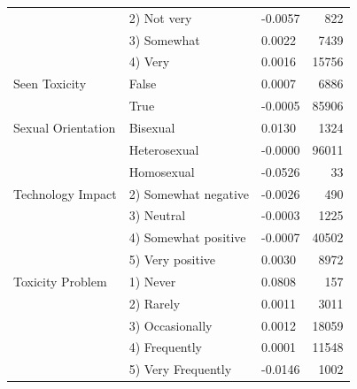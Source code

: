 \begin{table}[ht]
\begin{tabular}{lllr}
 & 2) Not very & -0.0057 & 822 \\
 & 3) Somewhat & 0.0022 & 7439 \\
 & 4) Very & 0.0016 & 15756 \\
Seen Toxicity & False & 0.0007 & 6886 \\
 & True & -0.0005 & 85906 \\
Sexual Orientation & Bisexual & 0.0130 & 1324 \\
 & Heterosexual & -0.0000 & 96011 \\
 & Homosexual & -0.0526 & 33 \\
Technology Impact & 2) Somewhat negative & -0.0026 & 490 \\
 & 3) Neutral & -0.0003 & 1225 \\
 & 4) Somewhat positive & -0.0007 & 40502 \\
 & 5) Very positive & 0.0030 & 8972 \\
Toxicity Problem & 1) Never & 0.0808 & 157 \\
 & 2) Rarely & 0.0011 & 3011 \\
 & 3) Occasionally & 0.0012 & 18059 \\
 & 4) Frequently & 0.0001 & 11548 \\
 & 5) Very Frequently & -0.0146 & 1002 \\
\bottomrule
\end{tabular}
\end{table}
